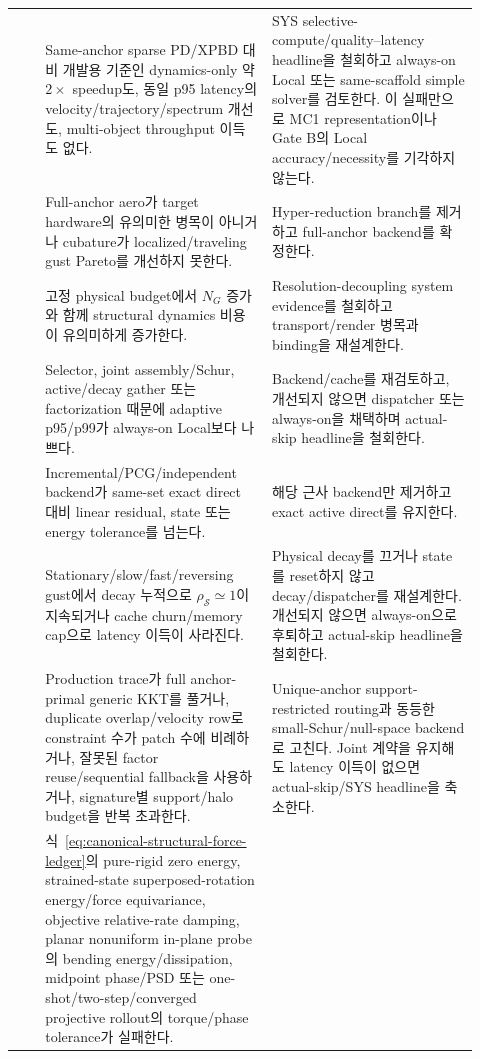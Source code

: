 \documentclass[11pt,a4paper]{article}
\begin{document}
\begin{longtable}{L{0.06\linewidth}L{0.45\linewidth}L{0.41\linewidth}}
 & Same-anchor sparse PD/XPBD 대비 개발용 기준인 dynamics-only 약 \(2\times\) speedup도,
동일 p95 latency의 velocity/trajectory/spectrum 개선도, multi-object throughput 이득도 없다.
& SYS selective-compute/quality--latency headline을 철회하고 always-on Local 또는 same-scaffold simple solver를 검토한다.
이 실패만으로 MC1 representation이나 Gate B의 Local accuracy/necessity를 기각하지 않는다. \\
 & Full-anchor aero가 target hardware의 유의미한 병목이 아니거나 cubature가
localized/traveling gust Pareto를 개선하지 못한다. & Hyper-reduction branch를 제거하고 full-anchor backend를 확정한다. \\
 & 고정 physical budget에서 \(N_G\) 증가와 함께 structural dynamics 비용이 유의미하게 증가한다. & Resolution-decoupling system evidence를 철회하고 transport/render 병목과 binding을 재설계한다. \\
 & Selector, joint assembly/Schur, active/decay gather 또는 factorization 때문에 adaptive p95/p99가 always-on Local보다 나쁘다. & Backend/cache를 재검토하고, 개선되지 않으면 dispatcher 또는 always-on을 채택하며 actual-skip headline을 철회한다. \\
 & Incremental/PCG/independent backend가 same-set exact direct 대비 linear residual, state 또는 energy tolerance를 넘는다. & 해당 근사 backend만 제거하고 exact active direct를 유지한다. \\
 & Stationary/slow/fast/reversing gust에서 decay 누적으로 \(\rho_{\mathcal S}\simeq1\)이 지속되거나 cache churn/memory cap으로 latency 이득이 사라진다. & Physical decay를 끄거나 state를 reset하지 않고 decay/dispatcher를 재설계한다. 개선되지 않으면 always-on으로 후퇴하고 actual-skip headline을 철회한다. \\
 & Production trace가 full anchor-primal generic KKT를 풀거나, duplicate overlap/velocity row로 constraint 수가 patch 수에 비례하거나, 잘못된 factor reuse/sequential fallback을 사용하거나, signature별 support/halo budget을 반복 초과한다. & Unique-anchor support-restricted routing과 동등한 small-Schur/null-space backend로 고친다. Joint 계약을 유지해도 latency 이득이 없으면 actual-skip/SYS headline을 축소한다. \\
 & 식~\eqref{eq:canonical-structural-force-ledger}의 pure-rigid zero energy,
strained-state superposed-rotation energy/force equivariance, objective relative-rate damping,
planar nonuniform in-plane probe의 bending energy/dissipation,
midpoint phase/PSD 또는 one-shot/two-step/converged projective rollout의 torque/phase tolerance가 실패한다.

\end{longtable}
\end{document}
